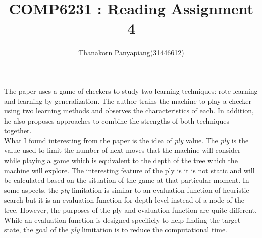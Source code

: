 \documentclass{article}
\title{COMP6231 : Reading Assignment 4}
\author{Thanakorn Panyapiang(31446612)}
\date{}
\begin{document}
\maketitle

The paper uses a game of checkers to study two learning techniques: rote learning and learning by generalization. The author trains the machine to play a checker using two learning methods and observes the characteristics of each. In addition, he also proposes approaches to combine the strengths of both techniques together.\\

\indent What I found interesting from the paper is the idea of \textit{ply} value. The \textit{ply} is the value used to limit the number of next moves that the machine will consider while playing a game which is equivalent to the depth of the tree which the machine will explore. The interesting feature of the ply is it is not static and will be calculated based on the situation of the game at that particular moment. In some aspects, the \textit{ply} limitation is similar to an evaluation function of heuristic search but it is an evaluation function for depth-level instead of a node of the tree. However, the purposes of the ply and evaluation function are quite different. While an evaluation function is designed specificly to help finding the target state, the goal of the \textit{ply} limitation is to reduce the computational time.
\end{document}
